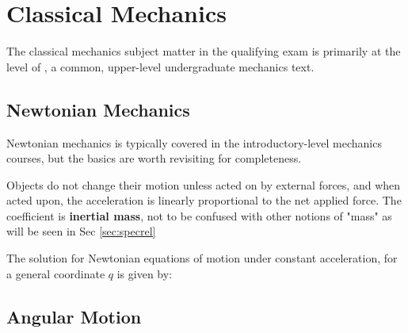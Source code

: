 \newpage
\chapter{Classical Mechanics}
\label{sec:classmech}
The classical mechanics subject matter in the qualifying exam is primarily at the level of \cite{thorntonClassicalDynamicsParticles2004}, a common, upper-level undergraduate mechanics text.


\section{Newtonian Mechanics}
Newtonian mechanics is typically covered in the introductory-level mechanics courses, but the basics are worth revisiting for completeness.

Objects do not change their motion unless acted on by external forces, and when acted upon, the acceleration is linearly proportional to the net applied force. The coefficient is \textbf{inertial mass}, not to be confused with other notions of "mass" as will be seen in Sec \ref{sec:specrel}


The solution for Newtonian equations of motion under constant acceleration, for a general coordinate $q$ is given by: 





\section{Angular Motion}







